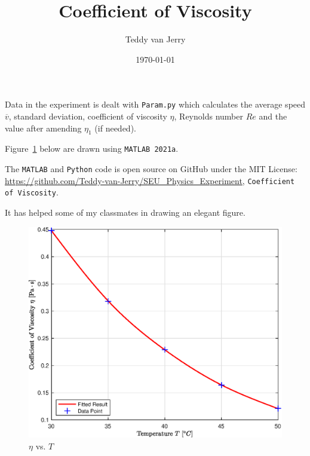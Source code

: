 \documentclass{article}
\title{\huge Coefficient of Viscosity}
\author{Teddy van Jerry}
\date{\today}
\begin{document}
    \maketitle

    Data in the experiment is dealt with \texttt{Param.py} which calculates the average speed $\overline{v}$, standard deviation, coefficient of viscosity $\eta$, Reynolds number $Re$ and the value after amending $\eta_1$ (if needed).

    Figure~\ref{fig:plot} below are drawn using \texttt{MATLAB 2021a}.

    The \texttt{MATLAB} and \texttt{Python} code is open source on GitHub under the MIT License: \url{https://github.com/Teddy-van-Jerry/SEU_Physics_Experiment}, \texttt{Coefficient of Viscosity}.

    It has helped some of my classmates in drawing an elegant figure.

    \begin{figure}[htbp]
        \centering
        \includegraphics[width=.75\linewidth]{Plot.eps}
        \caption{$\eta$ vs. $T$}
        \label{fig:plot}
    \end{figure}
\end{document}
